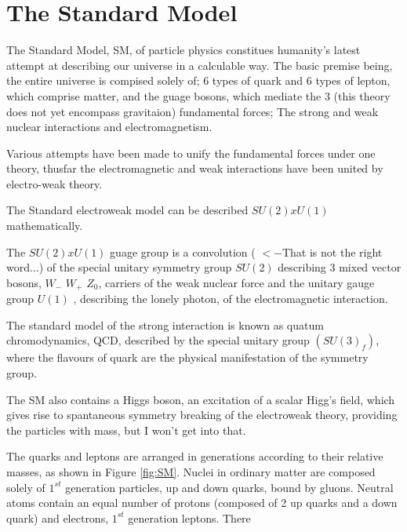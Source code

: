 \section{The Standard Model}\label{secSM:ch1}

The Standard Model, SM, of particle physics constitues humanity's latest attempt at describing our universe in a calculable way. The basic premise being, the entire universe is compised solely of; 6 types of quark and 6 types of lepton, which comprise matter, and the guage bosons, which mediate the 3 (this theory does not yet encompass gravitaion) fundamental forces; The strong and weak nuclear interactions and electromagnetism. 


Various attempts have been made to unify the fundamental forces under one theory, thusfar the electromagnetic and weak interactions have been united by electro-weak theory. 

The Standard electroweak model can be described $SU(2) x U(1)$ mathematically.

The  $SU(2) x U(1)$ guage group is a convolution ( $<- $That is not the right word...) of the special unitary symmetry group $SU(2)$ describing 3 mixed vector bosons, $W_{-}$ $W_{+}$ $Z_0$, carriers of the weak nuclear force and the unitary gauge group $U(1)$ , describing the lonely photon, of the electromagnetic interaction.

The standard model of the strong interaction is known as quatum chromodynamics, QCD, described by the special unitary group $(SU(3)_f)$, where the flavours of quark are the physical manifestation of the symmetry group.

The SM also contains a Higgs boson, an excitation of a scalar Higg's field, which gives rise to spantaneous symmetry breaking of the electroweak theory, providing the particles with mass, but I won't get into that. 

The quarks and leptons are arranged in generations according to their relative masses, as shown in Figure \ref{fig:SM}. Nuclei in ordinary matter are composed solely of $1^{st}$ generation particles, up and down quarks, bound by gluons. Neutral atoms contain an equal number of protons (composed of 2 up quarks and a down quark) and electrons, $1^{st}$ generation leptons. There 



